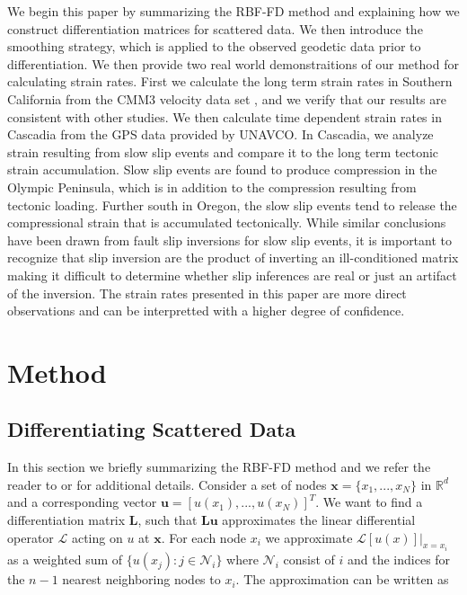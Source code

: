 \documentclass[10pt,a4paper]{article}
\begin{document}
We begin this paper by summarizing the RBF-FD method and explaining how we construct differentiation matrices for scattered data. We then introduce the smoothing strategy, which is applied to the observed geodetic data prior to differentiation.  We then provide two real world demonstraitions of our method for calculating strain rates.  First we calculate the long term strain rates in Southern California from the CMM3 velocity data set \citep{Shen2011}, and we verify that our results are consistent with other studies. We then calculate time dependent strain rates in Cascadia from the GPS data provided by UNAVCO.  In Cascadia, we analyze strain resulting from slow slip events and compare it to the long term tectonic strain accumulation. Slow slip events are found to produce compression in the Olympic Peninsula, which is in addition to the compression resulting from tectonic loading.  Further south in Oregon, the slow slip events tend to release the compressional strain that is accumulated tectonically.  While similar conclusions have been drawn from fault slip inversions for slow slip events, it is important to recognize that slip inversion are the product of inverting an ill-conditioned matrix making it difficult to determine whether slip inferences are real or just an artifact of the inversion.  The strain rates presented in this paper are more direct observations and can be interpretted with a higher degree of confidence. 

\section{Method}\label{sec:Method}
\subsection{Differentiating Scattered Data}\label{sec:Differentiating}

In this section we briefly summarizing the RBF-FD method and we refer the reader to \citet{Wright2006} or \citet{Fornberg2015} for additional details. Consider a set of nodes $\mathbf{x} = \{x_1, ..., x_N\}$ in $\mathbb{R}^d$ and a corresponding vector $\mathbf{u} = [u(x_1), ..., u(x_N)]^T$.  We want to find a differentiation matrix $\mathbf{L}$, such that $\mathbf{Lu}$ approximates the linear differential operator $\mathcal{L}$ acting on $u$ at $\mathbf{x}$.  For each node $x_i$ we approximate $\mathcal{L}[u(x)]\big|_{x=x_i}$ as a weighted sum of $\{u(x_j): j \in \mathcal{N}_i\}$ where $\mathcal{N}_i$ consist of $i$ and the indices for the $n-1$ nearest neighboring nodes to $x_i$.  The approximation can be written as
\end{document}

